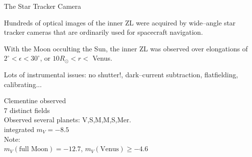 \documentclass[20pt,35mmSlide,landscape]{foils}
\begin{document}
\newpage
\pagecolor{light-yellow}
\normalsize

\parbox{10in}{
\parbox{5.5in}{
\begin{figure}[t]
\vspace*{-9ex}
\end{figure}
}
\hfil\parbox[c]{4.0in}{
\begin{center}
{\large The Star Tracker Camera\vspace*{2in}}
\end{center}
}
}

\parbox{10in}{\small
Hundreds of optical images of the inner ZL were acquired by 
wide--angle star tracker cameras that are ordinarily used for
spacecraft navigation.\vspace*{1ex}

With the Moon occulting the Sun, the inner ZL was observed over
elongations of \mbox{$2^\circ<\epsilon<30^\circ$}, or
$10R_\odot<r<$ Venus.\vspace*{1ex}

Lots of instrumental issues: no shutter!, dark--current
subtraction, flatfielding, calibrating...
}

\pagecolor{light-yellow}
\normalsize

\parbox{10in}{
\hspace*{-4ex}\parbox{7.25in}{
\begin{figure}[t]
\vspace*{-11ex}
\end{figure}
}
\hfil\parbox[c]{2.75in}{\small
Clementine observed\\
7 distinct fields\\

Observed several planets: V,S,M,M,S,Mer.\\

integrated $m_V=-8.5$\\

Note:\\
\mbox{$m_V(\mbox{full Moon})=-12.7$},
\mbox{$m_V(\mbox{Venus})\ge-4.6$}\vspace*{1in}
}
}

\newpage
\pagecolor{light-yellow}
\small
\end{document}
